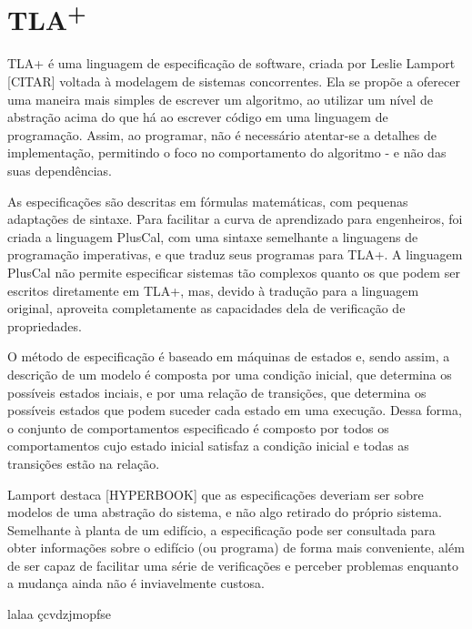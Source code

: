 \chapter{TLA\textsuperscript{+}}
\label{cap2}

TLA+ é uma linguagem de especificação de software, criada por Leslie Lamport [CITAR] voltada à modelagem de sistemas concorrentes. Ela se propõe a oferecer uma maneira mais simples de escrever um algoritmo, ao utilizar um nível de abstração acima do que há ao escrever código em uma linguagem de programação. Assim, ao programar, não é necessário atentar-se a detalhes de implementação, permitindo o foco no comportamento do algoritmo - e não das suas dependências.

As especificações são descritas em fórmulas matemáticas, com pequenas adaptações de sintaxe. Para facilitar a curva de aprendizado para engenheiros, foi criada a linguagem PlusCal, com uma sintaxe semelhante a linguagens de programação imperativas, e que traduz seus programas para TLA+. A linguagem PlusCal não permite especificar sistemas tão complexos quanto os que podem ser escritos diretamente em TLA+, mas, devido à tradução para a linguagem original, aproveita completamente as capacidades dela de verificação de propriedades.

O método de especificação é baseado em máquinas de estados e, sendo assim, a descrição de um modelo é composta por uma condição inicial, que determina os possíveis estados inciais, e por uma relação de transições, que determina os possíveis estados que podem suceder cada estado em uma execução. Dessa forma, o conjunto de comportamentos especificado é composto por todos os comportamentos cujo estado inicial satisfaz a condição inicial e todas as transições estão na relação.

Lamport destaca [HYPERBOOK] que as especificações deveriam ser sobre modelos de uma abstração do sistema, e não algo retirado do próprio sistema. Semelhante à planta de um edifício, a especificação pode ser consultada para obter informações sobre o edifício (ou programa) de forma mais conveniente, além de ser capaz de facilitar uma série de verificações e perceber problemas enquanto a mudança ainda não é inviavelmente custosa.



lalaa
çcvdzjmopfse

